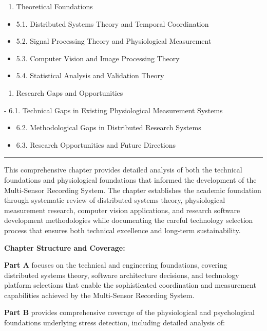 \documentclass[12pt,a4paper]{article}
\begin{document}
\begin{enumerate}
\item Theoretical Foundations

\end{enumerate}
\begin{itemize}
\item 5.1. Distributed Systems Theory and Temporal Coordination
\item 5.2. Signal Processing Theory and Physiological Measurement
\item 5.3. Computer Vision and Image Processing Theory
\item 5.4. Statistical Analysis and Validation Theory

\end{itemize}
\begin{enumerate}
\item Research Gaps and Opportunities

\end{enumerate}
-
6.1. Technical Gaps in Existing Physiological Measurement Systems
\begin{itemize}
\item 6.2. Methodological Gaps in Distributed Research Systems
\item 6.3. Research Opportunities and Future Directions

\end{itemize}
\hrule

This comprehensive chapter provides detailed analysis of both the technical foundations and physiological foundations
that informed the development of the Multi-Sensor Recording System. The chapter establishes the academic foundation
through systematic review of distributed systems theory, physiological measurement research, computer vision
applications, and research software development methodologies while documenting the careful technology selection process
that ensures both technical excellence and long-term sustainability.

\textbf{Chapter Structure and Coverage:}

\textbf{Part A} focuses on the technical and engineering foundations, covering distributed systems theory, software
architecture decisions, and technology platform selections that enable the sophisticated coordination and measurement
capabilities achieved by the Multi-Sensor Recording System.

\textbf{Part B} provides comprehensive coverage of the physiological and psychological foundations underlying stress
detection, including detailed analysis of:
\end{document}
